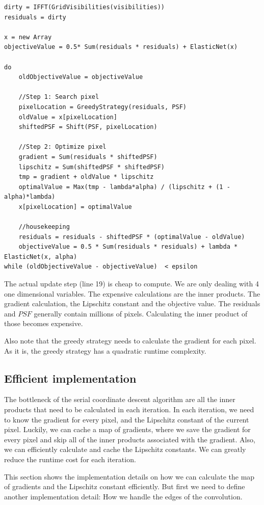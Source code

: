 \begin{lstlisting}
dirty = IFFT(GridVisibilities(visibilities))
residuals = dirty

x = new Array
objectiveValue = 0.5* Sum(residuals * residuals) + ElasticNet(x)

do 
	oldObjectiveValue = objectiveValue
	
	//Step 1: Search pixel
	pixelLocation = GreedyStrategy(residuals, PSF)
	oldValue = x[pixelLocation]
	shiftedPSF = Shift(PSF, pixelLocation)
	
	//Step 2: Optimize pixel
	gradient = Sum(residuals * shiftedPSF)
	lipschitz = Sum(shiftedPSF * shiftedPSF)
	tmp = gradient + oldValue * lipschitz 
	optimalValue = Max(tmp - lambda*alpha) / (lipschitz + (1 - alpha)*lambda)
	x[pixelLocation] = optimalValue

	//housekeeping
	residuals = residuals - shiftedPSF * (optimalValue - oldValue)
	objectiveValue = 0.5 * Sum(residuals * residuals) + lambda * ElasticNet(x, alpha)
while (oldObjectiveValue - objectiveValue)  < epsilon
\end{lstlisting}

The actual update step (line 19) is cheap to compute. We are only dealing with 4 one dimensional variables. The expensive calculations are the inner products. The gradient calculation, the Lipschitz constant and the objective value. The residuals and $PSF$ generally contain millions of pixels. Calculating the inner product of those becomes expensive. 

Also note that the greedy strategy needs to calculate the gradient for each pixel. As it is, the greedy strategy has a quadratic runtime complexity. 


\subsection{Efficient implementation}\label{cd:efficient}
The bottleneck of the serial coordinate descent algorithm are all the inner products that need to be calculated in each iteration. In each iteration, we need to know the gradient for every pixel, and the Lipschitz constant of the current pixel. Luckily, we can cache a map of gradients, where we save the gradient for every pixel and skip all of the inner products associated with the gradient. Also, we can efficiently calculate and cache the Lipschitz constants. We can greatly reduce the runtime cost for each iteration.

This section shows the implementation details on how we can calculate the map of gradients and the Lipschitz constant efficiently. But first we need to define another implementation detail: How we handle the edges of the convolution.

